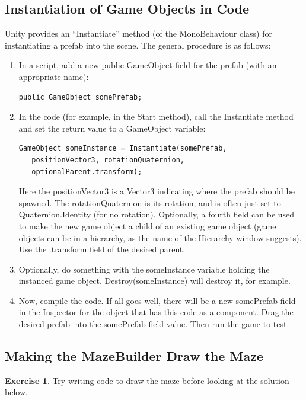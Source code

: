 \documentclass[12pt]{amsbook}
\theoremstyle{definition}
\newtheorem{exercise}{Exercise}[chapter]
\theoremstyle{remark}
\numberwithin{figure}{chapter}
\numberwithin{table}{chapter}
\numberwithin{section}{chapter}
\numberwithin{equation}{section}
\begin{document}
\subsection{Instantiation of Game Objects in Code}

Unity provides an ``Instantiate'' method (of the MonoBehaviour class) for instantiating a prefab into the scene.  The general procedure is as follows:
\begin{enumerate}
\item In a script, add a new public GameObject field for the prefab (with an appropriate name):
\begin{verbatim}
public GameObject somePrefab;
\end{verbatim}

\item In the code (for example, in the Start method), call the Instantiate method and set the return value to a GameObject variable:

\begin{verbatim}
GameObject someInstance = Instantiate(somePrefab, 
   positionVector3, rotationQuaternion, 
   optionalParent.transform);
\end{verbatim}
Here the positionVector3 is a Vector3 indicating where the prefab should be spawned.  The rotationQuaternion is its rotation, and is often just set to Quaternion.Identity (for no rotation). Optionally, a fourth field can be used to make the new game object a child of an existing game object (game objects can be in a hierarchy, as the name of the Hierarchy window suggests).  Use the .transform field of the desired parent.

\item Optionally, do something with the someInstance variable holding the instanced game object.  Destroy(someInstance) will destroy it, for example.

\item Now, compile the code.  If all goes well, there will be a new somePrefab field in the Inspector for the object that has this code as a component.  Drag the desired prefab into the somePrefab field value.  Then run the game to test.
\end{enumerate}

\subsection{Making the MazeBuilder Draw the Maze}

\begin{exercise}
Try writing code to draw the maze before looking at the solution below.
\end{exercise}
\end{document}
